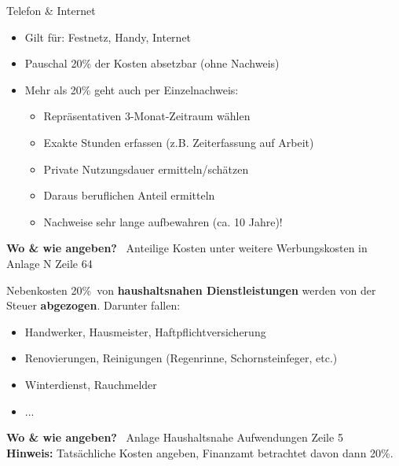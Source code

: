 \documentclass{beamer}
\begin{document}
			\begin{frame}{Telefon \& Internet}
				\begin{itemize}
					\item Gilt für: Festnetz, Handy, Internet
					\item Pauschal 20\% der Kosten absetzbar (ohne Nachweis)
					\item Mehr als 20\% geht auch per Einzelnachweis:
					\begin{itemize}
						\item Repräsentativen 3-Monat-Zeitraum wählen
						\item Exakte Stunden erfassen (z.B. Zeiterfassung auf Arbeit)
						\item Private Nutzungsdauer ermitteln/schätzen
						\item Daraus beruflichen Anteil ermitteln
						\item Nachweise sehr lange aufbewahren (ca. 10 Jahre)!
					\end{itemize}
				\end{itemize}\n\pause
				\textbf{Wo \& wie angeben?} \textrightarrow\ Anteilige Kosten unter weitere Werbungskosten in Anlage N Zeile 64
			\end{frame}
		
			\begin{frame}{Nebenkosten}
				20\%\ von \textbf{haushaltsnahen Dienstleistungen} werden von der Steuer \textbf{abgezogen}. Darunter fallen:
				\begin{itemize}
					\item Handwerker, Hausmeister, Haftpflichtversicherung
					\item Renovierungen, Reinigungen (Regenrinne, Schornsteinfeger, etc.)
					\item Winterdienst, Rauchmelder
					\item ...
				\end{itemize}\n
				\textbf{Wo \& wie angeben?} \textrightarrow\ Anlage Haushaltsnahe Aufwendungen Zeile 5\\\pause
				\textbf{Hinweis:} Tatsächliche Kosten angeben, Finanzamt betrachtet davon dann 20\%.
			\end{frame}
		
\end{document}
